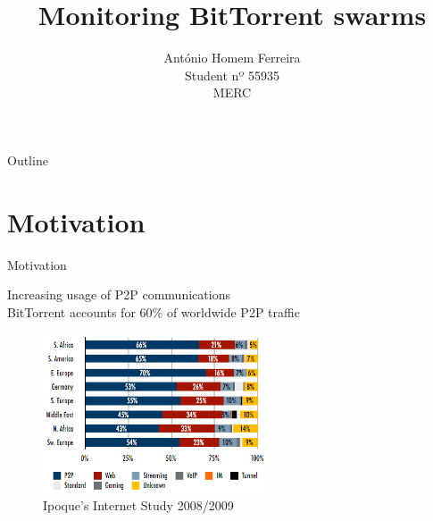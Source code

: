 \documentclass{beamer}
\title[Monitoring BitTorrent swarms \hspace{26mm} \insertframenumber/\inserttotalframenumber] %
{Monitoring BitTorrent swarms}
\subtitle
{}
\author[António Homem Ferreira] %
{António Homem Ferreira \\ Student nº 55935 \\ MERC}
\institute[Universities of Somewhere and Elsewhere] %
{
  INESC-ID, Communications Networks and Mobility\\
  Instituto Superior Técnico - Campus TagusPark
}
\date[CFP 2003] %
{}
\begin{document}
\begin{frame}
  \titlepage
\end{frame}

\begin{frame}{Outline}
  \tableofcontents[section]
\end{frame}





\section{Motivation}

\begin{frame}{Motivation}

 Increasing usage of P2P communications
\\
 BitTorrent accounts for 60\% of worldwide P2P traffic

\begin{figure} [h]
\includegraphics[height=1.85in]{figures/PercentagemP2P_total}
\caption{Ipoque's Internet Study 2008/2009}
\label{fig:1} 
\end{figure}

\end{frame}
\end{document}
